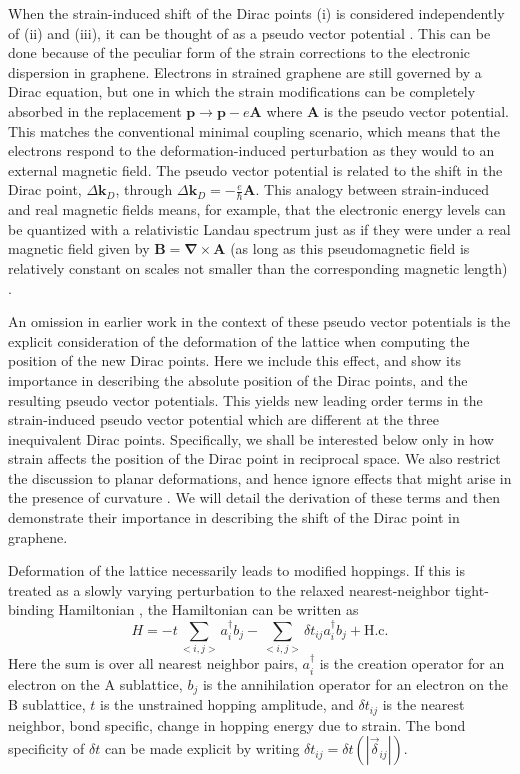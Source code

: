When the strain-induced shift of the Dirac points (i) is considered independently of (ii) and (iii), it can be thought of as a pseudo vector potential \cite{Sasaki2005,Ando2006,Manes2007,CastroNeto2009,Vozmediano2010}.
This can be done because of the peculiar form of the strain corrections to the electronic dispersion in graphene.
Electrons in strained graphene are still governed by a Dirac equation, but one in which the strain modifications can be completely absorbed in the replacement $\bm{p} \to \bm{p}-e\bm{A}$ where $\bm{A}$ is the pseudo vector potential.
This matches the conventional minimal coupling scenario, which means that the electrons respond to the deformation-induced perturbation as they would to an external magnetic field.  
The pseudo vector potential is related to the shift in the Dirac point, $\Delta \bm{k}_D$, through $\Delta \bm{k}_D=-\frac{e}{\hbar} \bm{A}$.
This analogy between strain-induced and real magnetic fields means, for example, that the electronic energy levels can be quantized with a relativistic Landau spectrum just as if they were under a real magnetic field given by $\bm{B}=\bm{\nabla}\times\bm{A}$ (as long as this pseudomagnetic field is relatively constant on scales not smaller than the corresponding magnetic length) \cite{CastroNeto2009}.

An omission in earlier work in the context of these pseudo vector potentials is the explicit consideration of the deformation of the lattice when computing the position of the new Dirac points.
Here we include this effect, and show its importance in describing the absolute position of the Dirac points, and the resulting pseudo vector potentials.
This yields new leading order terms in the strain-induced pseudo vector potential which are different at the three inequivalent Dirac points.
Specifically, we shall be interested below only in how strain affects the position of the Dirac point in reciprocal space.
We also restrict the discussion to planar deformations, and hence ignore effects that might arise in the presence of curvature \cite{CastroNeto2009,Vozmediano2010}.
We will detail the derivation of these terms and then demonstrate their importance in describing the shift of the Dirac point in graphene. 


Deformation of the lattice necessarily leads to modified hoppings. If this is treated as a slowly varying perturbation to the relaxed nearest-neighbor tight-binding Hamiltonian \cite{CastroNeto2009}, the Hamiltonian can be written as
\begin{equation}
  H = - t \sum_{<i,j>}a_i^{\dagger}b_j
    - \sum_{<i,j>} \delta t_{ij} a_i^{\dagger}b_j
    + \text{H.c.}
  \label{eq:PVP:H-TB}
\end{equation}
Here the sum is over all nearest neighbor pairs, $a_i^{\dagger}$ is the creation operator for an electron on the A sublattice, $b_j$ is the annihilation operator for an electron on the B sublattice, $t$ is the unstrained hopping amplitude, and $\delta t_{ij}$ is the nearest neighbor, bond specific, change in hopping energy due to strain. The bond specificity of $\delta t$ can be made explicit by writing $\delta t_{ij} = \delta t(|\vec{\delta}_{ij}|)$.

